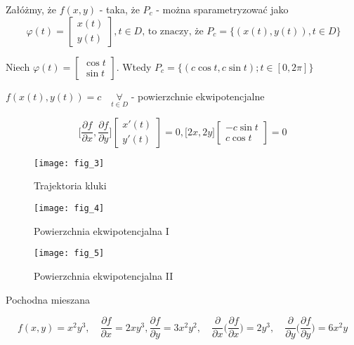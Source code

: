 \documentclass[../main.tex]{subfiles}
\begin{document}
Załóżmy, że $f(x,y)$ - taka, że $P_c$ - można sparametryzować jako $$~ \varphi(t) = \left [ \begin{matrix}
x(t)\\
y(t)\end{matrix}\right ], t\in D\text{, to znaczy, że }P_c = \{(x(t),y(t)), t\in D\}$$

\begin{przyklad}

\end{przyklad}
Niech $\varphi(t) = \left [ \begin{matrix}

\cos{t}\\
\sin{t}\end{matrix}\right ]$. Wtedy $P_c = \{(c\cos{t},c\sin{t});t\in[0,2\pi]\}$

$f(x(t),y(t)) = c \quad\underset{t\in D}{\forall}$ - powierzchnie ekwipotencjalne

$$\Big [ \frac{\partial f}{\partial x} , \frac{\partial f}{\partial y} \Big ] \left [ \begin{matrix}
x'(t)\\
    y'(t)\end{matrix}\right ] = 0, \Big [ 2x, 2y \Big ] \left [ \begin{matrix}
-c\sin{t}\\
c\cos{t}\end{matrix}\right ] = 0$$

\pagebreak

\begin{figure}
    \centering
    \texttt{[image: fig\_3]}
    \caption{Trajektoria kluki}
    \label{fig:kulka}
\end{figure}

\begin{figure}
    \centering
    \texttt{[image: fig\_4]}
    \caption{Powierzchnia ekwipotencjalna I}
    \label{fig:ekwiI}
\end{figure}

\begin{figure}
    \centering
    \texttt{[image: fig\_5]}
    \caption{Powierzchnia ekwipotencjalna II}
    \label{fig:ekwiII}
\end{figure}

\pagebreak


\begin{definicja}
    Pochodna mieszana
\end{definicja}
$$f(x,y) = x^2y^3, \quad \frac{\partial f}{\partial x} = 2xy^3, \frac{\partial f}{\partial y} = 3x^2y^2,\quad
\frac{\partial }{\partial x} \big (\frac{\partial f}{\partial x} \big ) = 2y^3,\quad
\frac{\partial }{\partial y} \big (\frac{\partial f}{\partial y} \big ) = 6x^2y$$
\end{document}
